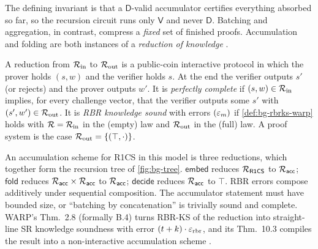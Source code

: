 The defining invariant is that a $\mathsf{D}$-valid accumulator certifies everything absorbed so
far, so the recursion circuit runs only $\mathsf{V}$ and never $\mathsf{D}$. Batching and
aggregation, in contrast, compress a \emph{fixed} set of finished proofs. Accumulation and
folding are both instances of a \emph{reduction of knowledge} \cite{KP23-RoK}.

\begin{definition}\label{def:bg-rok}
A reduction from $\mathcal{R}_{\mathrm{in}}$ to $\mathcal{R}_{\mathrm{out}}$ is a public-coin interactive protocol in
which the prover holds $(s,w)$ and the verifier holds $s$. At the end the verifier outputs
$s'$ (or rejects) and the prover outputs $w'$. It is \emph{perfectly complete} if
$(s,w)\in\mathcal{R}_{\mathrm{in}}$ implies, for every challenge vector, that the verifier outputs some
$s'$ with $(s',w')\in\mathcal{R}_{\mathrm{out}}$. It is \emph{RBR knowledge sound} with errors $(\varepsilon_m)$ if
\cref{def:bg-rbrks-warp} holds with $\mathcal{R}=\mathcal{R}_{\mathrm{in}}$ in the (empty) law and
$\mathcal{R}_{\mathrm{out}}$ in the (full) law. A proof system is the case
$\mathcal{R}_{\mathrm{out}}=\{(\top,\cdot)\}$.
\end{definition}

An accumulation scheme for R1CS in this model is three reductions, which together form the
recursion tree of \cref{fig:bg-tree}. $\mathsf{embed}$ reduces $\mathcal{R}_{\mathsf{R1CS}}$ to $\mathcal{R}_{\mathsf{acc}}$; $\mathsf{fold}$
reduces $\mathcal{R}_{\mathsf{acc}}\times\mathcal{R}_{\mathsf{acc}}$ to $\mathcal{R}_{\mathsf{acc}}$; $\mathsf{decide}$ reduces $\mathcal{R}_{\mathsf{acc}}$ to $\top$. RBR errors
compose additively under sequential composition. The accumulator statement must have bounded size,
or ``batching by concatenation'' is trivially sound and complete. WARP's Thm.~2.8 (formally B.4) turns RBR-KS of the reduction into straight-line SR knowledge
soundness with error $(t+k)\cdot\varepsilon_{\mathrm{rbr}}$, and its Thm.~10.3 compiles the result into a
non-interactive accumulation scheme \cite{BCFW25-WARP}.

